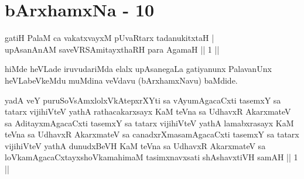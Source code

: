 \chapter{bArxhamxNa - 10}


\begin{shl}
gatiH PalaM ca vakatxvayxM pUvaRtarx tadanukitxtaH | \\
upAsanAnAM saveVRSAmitayxthaRH para AgamaH \hfill ||  1 || 
\end{shl}
\vskip 5pt
\begin{artha}
hiMde heVLade iruvudariMda elalx upAsanegaLa gatiyanunx PalavanUnx heVLabeVkeMdu muMdina veVdavu (bArxhamxNavu) baMdide.
\end{artha}

\vskip 5pt
\begin{kandikeshl}
yadA veY puruSoV\s sAmxlolxVkAtepxrXYti sa vAyumAgacaCxti tasemxY sa tatarx vijihiVteV yathA rathacakarxsayx KaM teVna sa UdhavxR AkarxmateV sa AditayxmAgacaCxti tasemxY sa tatarx vijihiVteV yathA lamabxrasayx KaM teVna sa UdhavxR AkarxmateV sa canadxrXmasamAgacaCxti tasemxY sa tatarx vijihiVteV yathA dunudxBeVH KaM teVna sa UdhavxR AkarxmateV sa loVkamAgacaCxtayxshoVkamahimaM tasimxnavxsati shAshavxtiVH samAH || 1 ||
\end{kandikeshl}

